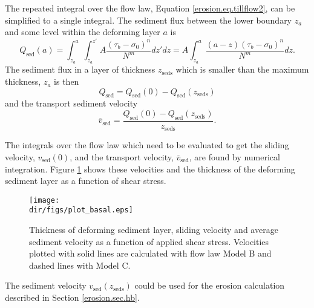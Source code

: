 The repeated integral over the flow law, Equation \eqref{erosion.eq.tillflow2}, can be simplified to a single integral. The sediment flux between the lower boundary $z_a$ and some level within the deforming layer $a$ is
\begin{equation}
  Q_{\text{sed}}(a)=\int_{z_a}^a\int_{z_a}^{z'}A\frac{(\tau_b-\sigma_0)^n}{N^m}dz'dz = A\int_{z_a}^a\frac{(a-z)(\tau_b-\sigma_0)^n}{N^m}dz.
\end{equation}
The sediment flux in a layer of thickness $z_{\text{seds}}$ which is smaller than the maximum thickness, $z_a$ is then
\begin{equation}
  Q_{\text{sed}} = Q_{\text{sed}}(0) - Q_{\text{sed}}(z_{\text{seds}})
\end{equation}
and the transport sediment velocity
\begin{equation}
  \overline{v}_{\text{sed}} = \frac{Q_{\text{sed}}(0) - Q_{\text{sed}}(z_{\text{seds}})}{z_{\text{seds}}}.
\end{equation}

The integrals over the flow law which need to be evaluated to get the sliding velocity, $v_{\text{sed}}(0)$, and the transport velocity, $\overline{v}_{\text{sed}}$, are found by numerical integration. Figure \ref{erosion.fig.sed_velos} shows these velocities and the thickness of the deforming sediment layer as a function of shear stress.

\begin{figure}[htbp]
  \centering
  \texttt{[image: \\dir/figs/plot\_basal.eps]}
  \caption{Thickness of deforming sediment layer, sliding velocity and average sediment velocity as a function of applied shear stress. Velocities plotted with solid lines are calculated with flow law Model B and dashed lines with Model C.}
  \label{erosion.fig.sed_velos}
\end{figure}

The sediment velocity $v_{\text{sed}}(z_{\text{seds}})$ could be used for the erosion calculation described in Section \ref{erosion.sec.hb}.

